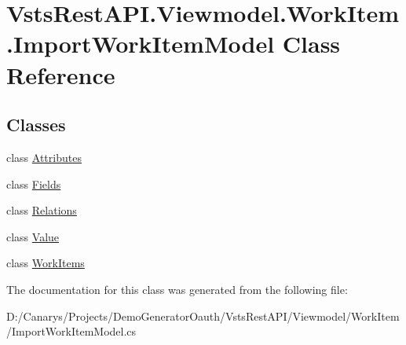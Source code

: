 \hypertarget{class_vsts_rest_a_p_i_1_1_viewmodel_1_1_work_item_1_1_import_work_item_model}{}\section{Vsts\+Rest\+A\+P\+I.\+Viewmodel.\+Work\+Item.\+Import\+Work\+Item\+Model Class Reference}
\label{class_vsts_rest_a_p_i_1_1_viewmodel_1_1_work_item_1_1_import_work_item_model}
\subsection*{Classes}
\begin{DoxyCompactItemize}
\item 
class \mbox{\hyperlink{class_vsts_rest_a_p_i_1_1_viewmodel_1_1_work_item_1_1_import_work_item_model_1_1_attributes}{Attributes}}
\item 
class \mbox{\hyperlink{class_vsts_rest_a_p_i_1_1_viewmodel_1_1_work_item_1_1_import_work_item_model_1_1_fields}{Fields}}
\item 
class \mbox{\hyperlink{class_vsts_rest_a_p_i_1_1_viewmodel_1_1_work_item_1_1_import_work_item_model_1_1_relations}{Relations}}
\item 
class \mbox{\hyperlink{class_vsts_rest_a_p_i_1_1_viewmodel_1_1_work_item_1_1_import_work_item_model_1_1_value}{Value}}
\item 
class \mbox{\hyperlink{class_vsts_rest_a_p_i_1_1_viewmodel_1_1_work_item_1_1_import_work_item_model_1_1_work_items}{Work\+Items}}
\end{DoxyCompactItemize}


The documentation for this class was generated from the following file\+:\begin{DoxyCompactItemize}
\item 
D\+:/\+Canarys/\+Projects/\+Demo\+Generator\+Oauth/\+Vsts\+Rest\+A\+P\+I/\+Viewmodel/\+Work\+Item/Import\+Work\+Item\+Model.\+cs\end{DoxyCompactItemize}
